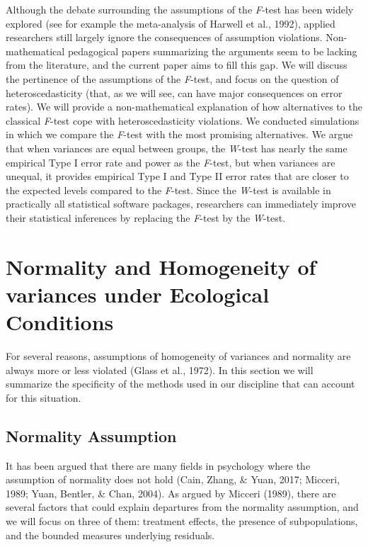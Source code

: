 \documentclass[man,floatsintext]{apa6}
\begin{document}
Although the debate surrounding the assumptions of the \emph{F}-test has been widely explored (see for example the meta-analysis of Harwell et al., 1992), applied researchers still largely ignore the consequences of assumption violations. Non-mathematical pedagogical papers summarizing the arguments seem to be lacking from the literature, and the current paper aims to fill this gap. We will discuss the pertinence of the assumptions of the \emph{F}-test, and focus on the question of heteroscedasticity (that, as we will see, can have major consequences on error rates). We will provide a non-mathematical explanation of how alternatives to the classical \emph{F}-test cope with heteroscedasticity violations. We conducted simulations in which we compare the \emph{F}-test with the most promising alternatives. We argue that when variances are equal between groups, the \emph{W}-test has nearly the same empirical Type I error rate and power as the \emph{F}-test, but when variances are unequal, it provides empirical Type I and Type II error rates that are closer to the expected levels compared to the \emph{F}-test. Since the \emph{W}-test is available in practically all statistical software packages, researchers can immediately improve their statistical inferences by replacing the \emph{F}-test by the \emph{W}-test.

\hypertarget{normality-and-homogeneity-of-variances-under-ecological-conditions}{%
\section{Normality and Homogeneity of variances under Ecological Conditions}\label{normality-and-homogeneity-of-variances-under-ecological-conditions}}

For several reasons, assumptions of homogeneity of variances and normality are always more or less violated (Glass et al., 1972). In this section we will summarize the specificity of the methods used in our discipline that can account for this situation.

\hypertarget{normality-assumption}{%
\subsection{Normality Assumption}\label{normality-assumption}}

It has been argued that there are many fields in psychology where the assumption of normality does not hold (Cain, Zhang, \& Yuan, 2017; Micceri, 1989; Yuan, Bentler, \& Chan, 2004). As argued by Micceri (1989), there are several factors that could explain departures from the normality assumption, and we will focus on three of them: treatment effects, the presence of subpopulations, and the bounded measures underlying residuals.
\end{document}
